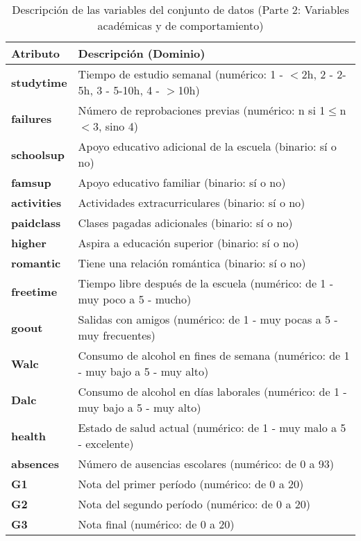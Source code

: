 \pagebreak

\begin{table}[htbp]
\centering
\caption{Descripción de las variables del conjunto de datos (Parte 2: Variables académicas y de comportamiento)}
\begin{tabular}{lp{8cm}}
\hline
\textbf{Atributo} & \textbf{Descripción (Dominio)} \\
\hline
\textbf{studytime} & Tiempo de estudio semanal (numérico: 1 - $<$2h, 2 - 2-5h, 3 - 5-10h, 4 - $>$10h) \\
\textbf{failures} & Número de reprobaciones previas (numérico: n si 1$\leq$n$<$3, sino 4) \\
\textbf{schoolsup} & Apoyo educativo adicional de la escuela (binario: sí o no) \\
\textbf{famsup} & Apoyo educativo familiar (binario: sí o no) \\
\textbf{activities} & Actividades extracurriculares (binario: sí o no) \\
\textbf{paidclass} & Clases pagadas adicionales (binario: sí o no) \\
\textbf{higher} & Aspira a educación superior (binario: sí o no) \\
\textbf{romantic} & Tiene una relación romántica (binario: sí o no) \\
\textbf{freetime} & Tiempo libre después de la escuela (numérico: de 1 - muy poco a 5 - mucho) \\
\textbf{goout} & Salidas con amigos (numérico: de 1 - muy pocas a 5 - muy frecuentes) \\
\textbf{Walc} & Consumo de alcohol en fines de semana (numérico: de 1 - muy bajo a 5 - muy alto) \\
\textbf{Dalc} & Consumo de alcohol en días laborales (numérico: de 1 - muy bajo a 5 - muy alto) \\
\textbf{health} & Estado de salud actual (numérico: de 1 - muy malo a 5 - excelente) \\
\textbf{absences} & Número de ausencias escolares (numérico: de 0 a 93) \\
\textbf{G1} & Nota del primer período (numérico: de 0 a 20) \\
\textbf{G2} & Nota del segundo período (numérico: de 0 a 20) \\
\textbf{G3} & Nota final (numérico: de 0 a 20) \\
\hline
\end{tabular}
\label{tab:variables_parte2}
\end{table}
